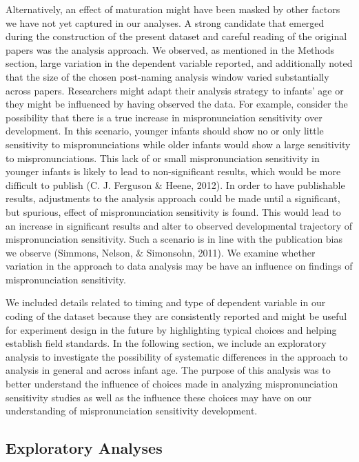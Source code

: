\documentclass[man]{apa6}
\theoremstyle{definition}
\theoremstyle{definition}
\theoremstyle{definition}
\theoremstyle{remark}
\begin{document}
Alternatively, an effect of maturation might have been masked by other
factors we have not yet captured in our analyses. A strong candidate
that emerged during the construction of the present dataset and careful
reading of the original papers was the analysis approach. We observed,
as mentioned in the Methods section, large variation in the dependent
variable reported, and additionally noted that the size of the chosen
post-naming analysis window varied substantially across papers.
Researchers might adapt their analysis strategy to infants' age or they
might be influenced by having observed the data. For example, consider
the possibility that there is a true increase in mispronunciation
sensitivity over development. In this scenario, younger infants should
show no or only little sensitivity to mispronunciations while older
infants would show a large sensitivity to mispronunciations. This lack
of or small mispronunciation sensitivity in younger infants is likely to
lead to non-significant results, which would be more difficult to
publish (C. J. Ferguson \& Heene, 2012). In order to have publishable
results, adjustments to the analysis approach could be made until a
significant, but spurious, effect of mispronunciation sensitivity is
found. This would lead to an increase in significant results and alter
to observed developmental trajectory of mispronunciation sensitivity.
Such a scenario is in line with the publication bias we observe
(Simmons, Nelson, \& Simonsohn, 2011). We examine whether variation in
the approach to data analysis may be have an influence on findings of
mispronunciation sensitivity.

We included details related to timing and type of dependent variable in
our coding of the dataset because they are consistently reported and
might be useful for experiment design in the future by highlighting
typical choices and helping establish field standards. In the following
section, we include an exploratory analysis to investigate the
possibility of systematic differences in the approach to analysis in
general and across infant age. The purpose of this analysis was to
better understand the influence of choices made in analyzing
mispronunciation sensitivity studies as well as the influence these
choices may have on our understanding of mispronunciation sensitivity
development.

\subsection{Exploratory Analyses}\label{exploratory-analyses}
\end{document}

